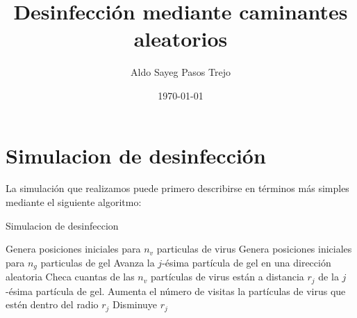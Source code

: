 \documentclass[11pt]{article}
\title{Desinfección mediante caminantes aleatorios}
\date{\today}
\author{Aldo Sayeg Pasos Trejo}
\begin{document}
\maketitle
\tableofcontents
\section{Simulacion de desinfección}
La simulación que realizamos puede primero describirse en términos más simples mediante el siguiente algoritmo:
\begin{algorithm}[h]
    \caption{Simulacion de desinfeccion}
    \begin{algorithmic}[1]
        \State Genera posiciones iniciales para $n_v$ particulas de virus
        \State Genera posiciones iniciales para $n_g$ particulas de gel 
                \State Avanza la $j$-ésima partícula de gel en una dirección aleatoria
                \State Checa cuantas de las $n_v$ partículas de virus están a distancia $r_j$ de la $j$-ésima partícula de gel. 
                \State Aumenta el número de visitas la partículas de virus que estén dentro del radio $r_j$
                    \State Disminuye $r_j$
                \EndIf 
            \EndFor
        \EndFor
    \EndFunction
    \end{algorithmic}
\end{algorithm}
\end{document}

